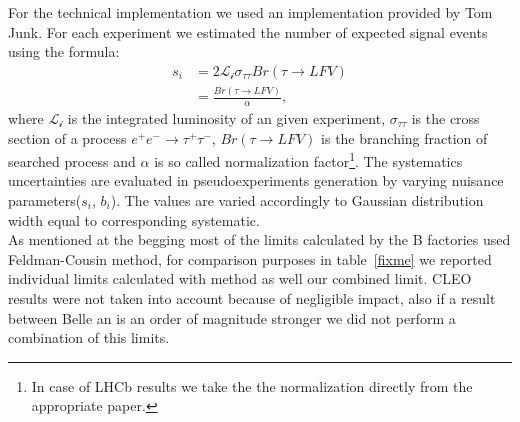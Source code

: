 For the technical implementation we used an implementation provided by Tom Junk\cite{tjunk}. For each experiment we estimated the number of expected signal events using the formula:
\begin{equation}
\begin{split}
s_i & =2\mathcal{L_i}\sigma_{\tau\tau}Br(\tau \rightarrow LFV) \\
& =\frac{Br(\tau \rightarrow LFV)}{\alpha},
\end{split}
\end{equation}
where $\mathcal{L_i}$ is the integrated luminosity of an given experiment, $\sigma_{\tau\tau}$ is the cross section of a process $e^+ e^- \rightarrow  \tau^+ \tau^-$, $Br(\tau \rightarrow LFV)$ is the branching fraction of searched process and $\alpha$ is so called normalization factor\footnote{In case of LHCb results we take the the normalization directly from the appropriate paper.}. The systematics uncertainties are evaluated in pseudoexperiments generation by varying nuisance parameters($s_i$, $b_i$). The values are varied accordingly to Gaussian distribution width equal to corresponding systematic.\\
As mentioned at the begging most of the limits calculated by the B factories used Feldman-Cousin method, for comparison purposes in table~\ref{fixme} we reported individual limits calculated with \cls method as well our combined limit. CLEO results were not taken into account because of negligible impact, also if a result between Belle an \babar is an order of magnitude stronger we did not perform a combination of this limits.



